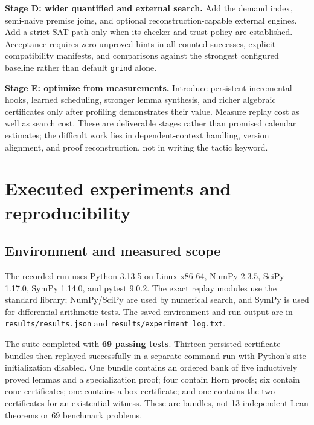 \documentclass[11pt,a4paper]{article}
\newcommand{\code}[1]{\texttt{#1}}
\begin{document}
\textbf{Stage D: wider quantified and external search.} Add the demand index,
semi-naive premise joins, and optional reconstruction-capable external engines.
Add a strict SAT path only when its checker and trust policy are established.
Acceptance requires zero unproved hints in all counted successes, explicit
compatibility manifests, and comparisons against the strongest configured
baseline rather than default \code{grind} alone.

\textbf{Stage E: optimize from measurements.} Introduce persistent incremental
hooks, learned scheduling, stronger lemma synthesis, and richer algebraic
certificates only after profiling demonstrates their value. Measure replay
cost as well as search cost. These are deliverable stages rather than promised
calendar estimates; the difficult work lies in dependent-context handling,
version alignment, and proof reconstruction, not in writing the tactic keyword.

\section{Executed experiments and reproducibility}
\label{sec:experiments}

\subsection{Environment and measured scope}
The recorded run uses Python 3.13.5 on Linux x86-64, NumPy 2.3.5, SciPy 1.17.0,
SymPy 1.14.0, and pytest 9.0.2. The exact replay modules use the standard library;
NumPy/SciPy are used by numerical search, and SymPy is used for differential
arithmetic tests. The saved environment and run output are in
\code{results/results.json} and \code{results/experiment\_log.txt}.

The suite completed with \textbf{69 passing tests}. Thirteen persisted
certificate bundles then replayed successfully in a separate command run with
Python's site initialization disabled. One bundle contains an ordered bank of
five inductively proved lemmas and a specialization proof; four contain Horn
proofs; six contain cone certificates; one contains a box certificate; and one
contains the two certificates for an existential witness. These are bundles,
not 13 independent Lean theorems or 69 benchmark problems.
\end{document}
